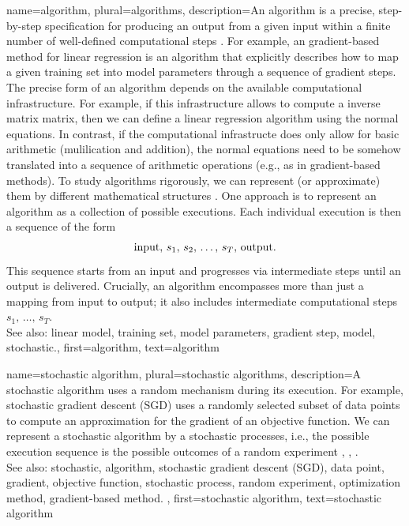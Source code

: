 {
{name={algorithm}, plural={algorithms},
 	description={An algorithm is a precise, step-by-step specification for 
  		producing an output from a given input within a finite number of well-defined 
		computational steps \cite{Cormen:2022aa}. For example, an gradient-based method for linear regression 
		is an algorithm that explicitly describes how to map a given training set 
		into model parameters through a sequence of gradient steps. The precise form of 
		an algorithm depends on the available computational infrastructure. For example, if 
		this infrastructure allows to compute a inverse matrix matrix, then we can 
		define a linear regression algorithm using the normal equations. In contrast, if 
		the computational infrastructe does only allow for basic arithmetic (mulilication and addition), 
		the normal equations need to be somehow translated into a sequence of arithmetic 
		operations (e.g., as in gradient-based methods). 
		To study algorithms rigorously, we can represent (or approximate) them by different 
			mathematical structures \cite{Sipser2013}. One approach is to represent an algorithm 
			as a collection of possible executions. Each individual execution is then a 
			sequence of the form $${\rm input}, \,s_1, \,s_2, \,\ldots, \,s_T, \,{\rm output}.$$ 
			This sequence starts from an input and progresses via intermediate steps until an 
			output is delivered. Crucially, an algorithm encompasses more than just a mapping 
			from input to output; it also includes intermediate computational 
     		steps $s_1, \,\ldots, \,s_T$.
				\\ 
		See also: linear model, training set, model parameters, gradient step, model, stochastic.},
	first={algorithm},
	text={algorithm} 
}

{name={stochastic algorithm}, 
 plural={stochastic algorithms},
	description={A stochastic algorithm uses a random mechanism 
		during its execution. For example, stochastic gradient descent (SGD) uses a randomly selected subset of data points 
		to compute an approximation for the gradient of an objective function. We can represent a 
		stochastic algorithm by a stochastic processes, i.e., the possible execution sequence is the possible outcomes of 
		a random experiment \cite{BertsekasProb}, \cite{RandomizedAlgos}, \cite{Gallager13}.		
		\\ 
		See also: stochastic, algorithm, stochastic gradient descent (SGD), data point, gradient, objective function, stochastic process, 
		random experiment, optimization method, gradient-based method. },
	first={stochastic algorithm},
	text={stochastic algorithm} 
}

}
